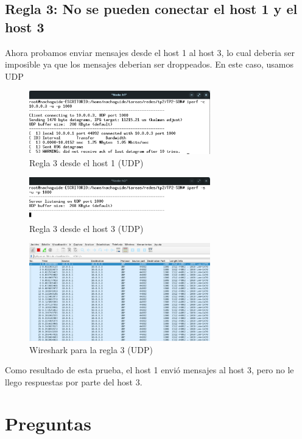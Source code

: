 \documentclass[titlepage,a4paper]{article}
\begin{document}
\subsection{Regla 3: No se pueden conectar el host 1 y el host 3}
Ahora probamos enviar mensajes desde el host 1 al host 3, lo cual deberia ser imposible ya que los mensajes deberian ser droppeados. En este caso, usamos UDP

\begin{figure}[H]
    \centering
    \includegraphics[width=0.7\textwidth]{img/regla3_h1_udp.png}
    \caption{Regla 3 desde el host 1 (UDP)}
\end{figure}

\begin{figure}[H]
    \centering
    \includegraphics[width=0.7\textwidth]{img/regla3_h3_udp.png}
    \caption{Regla 3 desde el host 3 (UDP)}
\end{figure}

\begin{figure}[H]
    \centering
    \includegraphics[width=0.7\textwidth]{img/regla3_wireshark_udp.png}
    \caption{Wireshark para la regla 3 (UDP)}
\end{figure}

Como resultado de esta prueba, el host 1 envió mensajes al host 3, pero no le llego respuestas por parte del host 3.



\section{Preguntas}\label{sec:preguntasAResponder}
\end{document}
